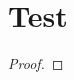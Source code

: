 \documentclass[10pt,a5paper]{book}
\begin{document}
\chapter{Test}

\begin{instance}[Test]
\lipsum[2-3]
\end{instance}

\begin{remark}[Test]
\lipsum[2]
\end{remark}

\begin{example}[Test]
\lipsum[2]
\end{example}

\begin{proof}
\lipsum[2]
\end{proof}
\end{document}
